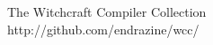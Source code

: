 \documentclass[twoside]{book}
\newcommand{\clearemptydoublepage}{%
  \newpage{\pagestyle{empty}\cleardoublepage}%
}
\newcommand{\+}{}
\begin{document}
\hypersetup{pageanchor=false}
\begin{titlepage}
\vspace*{7cm}
\begin{center}%
{\Large The Witchcraft Compiler Collection}\\
\vspace*{1cm}
{\large http://github.com/endrazine/wcc/}\\
\vspace*{0.5cm}
\end{center}
\end{titlepage}
\clearemptydoublepage
\tableofcontents
\clearemptydoublepage
{}
\hypersetup{pageanchor=true}

\end{document}
